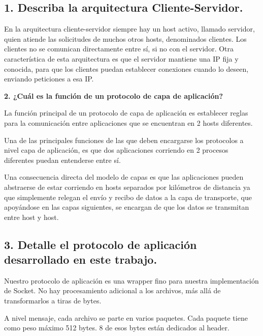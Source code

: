 \documentclass{article}
\begin{document}
\subsection{\texorpdfstring{\textbf{1. Describa la arquitectura Cliente-Servidor.}}{1. Describa la arquitectura Cliente-Servidor.}}\label{describa-la-arquitectura-cliente-servidor.}

En la arquitectura cliente-servidor siempre hay un host activo, llamado servidor, quien atiende las solicitudes de muchos otros hosts, denominados clientes. Los clientes no se comunican directamente entre sí, si no con el servidor. Otra característica de esta arquitectura es que el servidor mantiene una IP fija y conocida, para que los clientes puedan establecer conexiones cuando lo deseen, enviando peticiones a esa IP.

\textbf{2. ¿Cuál es la función de un protocolo de capa de aplicación?}

La función principal de un protocolo de capa de aplicación es establecer reglas para la comunicación entre aplicaciones que se encuentran en 2 hosts diferentes.

Una de las principales funciones de las que deben encargarse los protocolos a nivel capa de aplicación, es que dos aplicaciones corriendo en 2 procesos diferentes puedan entenderse entre sí.

Una consecuencia directa del modelo de capas es que las aplicaciones pueden abstraerse de estar corriendo en hosts separados por kilómetros de distancia ya que simplemente relegan el envío y recibo de datos a la capa de transporte, que apoyándose en las capas siguientes, se encargan de que los datos se transmitan entre host y host.

\subsection{\texorpdfstring{\textbf{3. Detalle el protocolo de
aplicación desarrollado en este trabajo.}}{3. Detalle el protocolo de aplicación desarrollado en este trabajo.}}\label{detalle-el-protocolo-de-aplicaciuxf3n-desarrollado-en-este-trabajo.}

Nuestro protocolo de aplicación es una wrapper fino para nuestra implementación de Socket. No hay procesamiento adicional a los archivos, más allá de transformarlos a tiras de bytes.

A nivel mensaje, cada archivo se parte en varios paquetes. Cada paquete tiene como peso máximo 512 bytes. 8 de esos bytes están dedicados al header.
\end{document}
